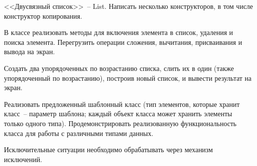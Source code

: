 
<<Двусвязный список>>~-- List. Написать несколько конструкторов, в том числе конструктор
копирования.

В классе реализовать методы для включения элемента в список, удаления и
поиска элемента. Перегрузить операции сложения, вычитания, присваивания и вывода на
экран.

Создать два упорядоченных по возрастанию списка, слить их в один (также
упорядоченный по возрастанию), построив новый список, и вывести результат на экран.

Реализовать предложенный шаблонный класс (тип элементов, которые
хранит класс~-- параметр шаблона; каждый объект класса может хранить
элементы только одного типа). Продемонстрировать реализованную
функциональность класса для работы с различными типами данных.

Исключительные ситуации необходимо обрабатывать через механизм исключений.
